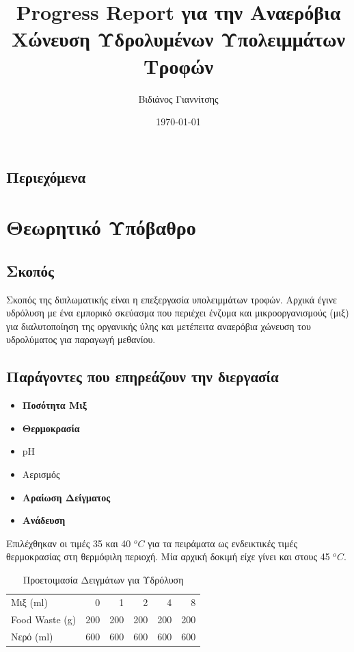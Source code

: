 \documentclass[11pt]{article}
\author{Βιδιάνος Γιαννίτσης}
\date{\today}
\title{Progress Report για την Αναερόβια Χώνευση Υδρολυμένων Υπολειμμάτων Τροφών}
\begin{document}
\maketitle

\subsection{Περιεχόμενα}
\label{sec:orgbb94266}

\section{Θεωρητικό Υπόβαθρο}
\label{sec:org57e70ec}
\subsection{Σκοπός}
\label{sec:org6c86760}
Σκοπός της διπλωματικής είναι η επεξεργασία υπολειμμάτων τροφών. Αρχικά έγινε υδρόλυση με ένα εμπορικό σκεύασμα που περιέχει ένζυμα και μικροοργανισμούς (μιξ) για διαλυτοποίηση της οργανικής ύλης και μετέπειτα αναερόβια χώνευση του υδρολύματος για παραγωγή μεθανίου.

\subsection{Παράγοντες που επηρεάζουν την διεργασία}
\label{sec:org3243f22}
\begin{itemize}
\item {\color{blue} \textbf{Ποσότητα Μιξ} }

\item {\color{blue} \textbf{Θερμοκρασία} }

\item {\color{blue}pH}
\end{itemize}

\begin{itemize}
\item {\color{orange}Αερισμός}

\item {\color{orange} \textbf{Αραίωση Δείγματος} }

\item {\color{orange} \textbf{Ανάδευση} }
\end{itemize}

Επιλέχθηκαν οι τιμές 35 και 40 \(^oC\) για τα πειράματα ως ενδεικτικές τιμές θερμοκρασίας στη θερμόφιλη περιοχή. Μία αρχική δοκιμή είχε γίνει και στους 45 \(^oC\).

\begin{table}[htbp]
\caption{Προετοιμασία Δειγμάτων για Υδρόλυση}
\centering
\begin{tabular}{lrrrrr}
Μιξ (ml) & 0 & 1 & 2 & 4 & 8\\[0pt]
Food Waste (g) & 200 & 200 & 200 & 200 & 200\\[0pt]
Νερό (ml) & 600 & 600 & 600 & 600 & 600\\[0pt]
\end{tabular}
\end{table}
\end{document}
